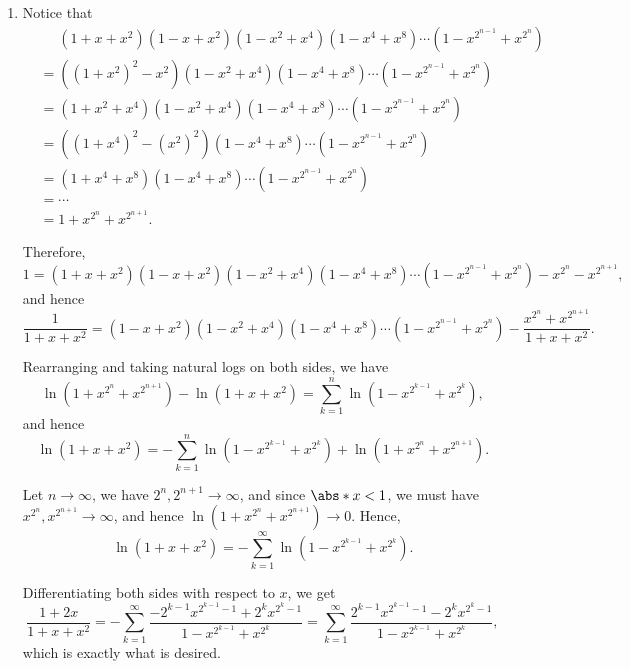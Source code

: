 \begin{enumerate}
    \item Notice that
          \begin{align*}
               & \phantom{=} (1 + x + x^2) (1 - x + x^2) (1 - x^2 + x^4) (1 - x^4 + x^8) \cdots (1 - x^{2^{n - 1}} + x^{2^n}) \\
               & = ((1 + x^2)^2 - x^2) (1 - x^2 + x^4) (1 - x^4 + x^8) \cdots (1 - x^{2^{n - 1}} + x^{2^n})                   \\
               & = (1 + x^2 + x^4) (1 - x^2 + x^4) (1 - x^4 + x^8) \cdots (1 - x^{2^{n - 1}} + x^{2^n})                       \\
               & = ((1 + x^4)^2 - (x^2)^2) (1 - x^4 + x^8) \cdots (1 - x^{2^{n - 1}} + x^{2^n})                               \\
               & = (1 + x^4 + x^8)(1 - x^4 + x^8) \cdots (1 - x^{2^{n - 1}} + x^{2^n})                                        \\
               & = \cdots                                                                                                     \\
               & = 1 + x^{2^n} + x^{2^{n + 1}}.
          \end{align*}

          Therefore,
          \[
              1 = (1 + x + x^2) (1 - x + x^2) (1 - x^2 + x^4) (1 - x^4 + x^8) \cdots (1 - x^{2^{n - 1}} + x^{2^n}) - x^{2^n} - x^{2^{n + 1}},
          \]
          and hence
          \[
              \frac{1}{1 + x + x^2} = (1 - x + x^2) (1 - x^2 + x^4) (1 - x^4 + x^8) \cdots (1 - x^{2^{n - 1}} + x^{2^n}) - \frac{x^{2^n} + x^{2^{n + 1}}}{1 + x + x^2}.
          \]

          Rearranging and taking natural logs on both sides, we have
          \[
              \ln(1 + x^{2^n} + x^{2^{n + 1}}) - \ln (1 + x + x^2) = \sum_{k = 1}^{n} \ln(1 - x^{2^{k - 1}} + x^{2^k}),
          \]
          and hence
          \[
              \ln (1 + x + x^2) = -\sum_{k = 1}^{n} \ln(1 - x^{2^{k - 1}} + x^{2^k}) + \ln(1 + x^{2^n} + x^{2^{n + 1}}).
          \]

          Let \(n \to \infty\), we have \(2^n, 2^{n + 1} \to \infty\), and since \(\abs*{x} < 1\), we must have \(x^{2^n}, x^{2^{n + 1}} \to \infty\), and hence \(\ln(1 + x^{2^n} + x^{2^{n + 1}}) \to 0\). Hence,
          \[
              \ln (1 + x + x^2) = - \sum_{k = 1}^{\infty} \ln(1 - x^{2^{k - 1}} + x^{2^k}).
          \]

          Differentiating both sides with respect to \(x\), we get
          \[
              \frac{1 + 2x}{1 + x + x^2} = - \sum_{k = 1}^{\infty} \frac{- 2^{k - 1} x^{2^{k - 1} - 1} + 2^{k} x^{2^{k} - 1} }{1 - x^{2^{k - 1}} + x^{2^k}} = \sum_{k = 1}^{\infty} \frac{2^{k - 1} x^{2^{k - 1} - 1} - 2^{k} x^{2^{k} - 1} }{1 - x^{2^{k - 1}} + x^{2^k}},
          \]
          which is exactly what is desired.
\end{enumerate}